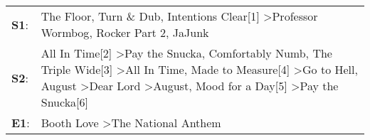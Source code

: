 \begin{supertabular}{p{0.03\textwidth}p{0.92\textwidth}}
 \textbf{S1}:  &                                                                                                                                                                                                                                                                                                                             The Floor\textsuperscript{}, \enspace Turn \& Dub\textsuperscript{}, \enspace Intentions Clear[1]\textsuperscript{} \textgreater \enspace Professor Wormbog\textsuperscript{}, \enspace Rocker Part 2\textsuperscript{}, \enspace JaJunk\textsuperscript{}  \enspace  \\
 \textbf{S2}:  &  All In Time[2]\textsuperscript{} \textgreater \enspace Pay the Snucka\textsuperscript{}, \enspace Comfortably Numb\textsuperscript{}, \enspace The Triple Wide[3]\textsuperscript{} \textgreater \enspace All In Time\textsuperscript{}, \enspace Made to Measure[4]\textsuperscript{} \textgreater \enspace Go to Hell\textsuperscript{}, \enspace August\textsuperscript{} \textgreater \enspace Dear Lord\textsuperscript{} \textgreater \enspace August\textsuperscript{}, \enspace Mood for a Day[5]\textsuperscript{} \textgreater \enspace Pay the Snucka[6]\textsuperscript{}  \enspace  \\
 \textbf{E1}:  &                                                                                                                                                                                                                                                                                                                                                                                                                                                                                               Booth Love\textsuperscript{} \textgreater \enspace The National Anthem\textsuperscript{}  \enspace  \\
\end{supertabular}
